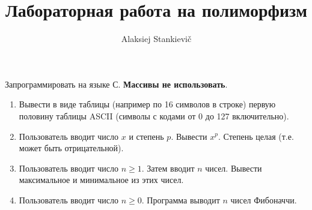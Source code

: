 \documentclass[12pt]{article}
\author{Alaksiej Stankievič}
\title{Лабораторная работа на полиморфизм}
\begin{document}
 Запрограммировать на языке С. \textbf{Массивы не использовать}.
 \begin{enumerate}
  \item Вывести в виде таблицы (например по 16 символов в строке) первую половину таблицы ASCII (символы с кодами от 0 до 127 включительно).
  \item Пользователь вводит число $x$ и степень $p$. Вывести $x^p$. Степень целая (т.е. может быть отрицательной).
  \item Пользователь вводит число $n\geq1$. Затем вводит $n$ чисел. Вывести максимальное и минимальное из этих чисел.
  \item Пользователь вводит число $n\geq0$. Программа выводит $n$ чисел Фибоначчи. 
 \end{enumerate}
\end{document}
